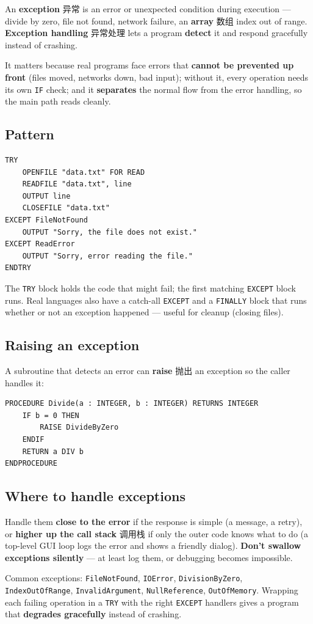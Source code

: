 \documentclass[11pt]{article}
\begin{document}
An \textbf{exception} 异常 is an error or unexpected condition during execution — divide by zero, file not found, network failure, an \textbf{array} 数组 index out of range. \textbf{Exception handling} 异常处理 lets a program \textbf{detect} it and respond gracefully instead of crashing.

It matters because real programs face errors that \textbf{cannot be prevented up front} (files moved, networks down, bad input); without it, every operation needs its own \texttt{IF} check; and it \textbf{separates} the normal flow from the error handling, so the main path reads cleanly.

\subsection*{Pattern}

\begin{Verbatim}
TRY
    OPENFILE "data.txt" FOR READ
    READFILE "data.txt", line
    OUTPUT line
    CLOSEFILE "data.txt"
EXCEPT FileNotFound
    OUTPUT "Sorry, the file does not exist."
EXCEPT ReadError
    OUTPUT "Sorry, error reading the file."
ENDTRY
\end{Verbatim}

The \texttt{TRY} block holds the code that might fail; the first matching \texttt{EXCEPT} block runs. Real languages also have a catch-all \texttt{EXCEPT} and a \texttt{FINALLY} block that runs whether or not an exception happened — useful for cleanup (closing files).

\subsection*{Raising an exception}

A subroutine that detects an error can \textbf{raise} 抛出 an exception so the caller handles it:

\begin{Verbatim}
PROCEDURE Divide(a : INTEGER, b : INTEGER) RETURNS INTEGER
    IF b = 0 THEN
        RAISE DivideByZero
    ENDIF
    RETURN a DIV b
ENDPROCEDURE
\end{Verbatim}

\subsection*{Where to handle exceptions}

Handle them \textbf{close to the error} if the response is simple (a message, a retry), or \textbf{higher up the call stack} 调用栈 if only the outer code knows what to do (a top-level GUI loop logs the error and shows a friendly dialog). \textbf{Don't swallow exceptions silently} — at least log them, or debugging becomes impossible.

Common exceptions: \texttt{FileNotFound}, \texttt{IOError}, \texttt{DivisionByZero}, \texttt{IndexOutOfRange}, \texttt{InvalidArgument}, \texttt{NullReference}, \texttt{OutOfMemory}. Wrapping each failing operation in a \texttt{TRY} with the right \texttt{EXCEPT} handlers gives a program that \textbf{degrades gracefully} instead of crashing.
\end{document}
